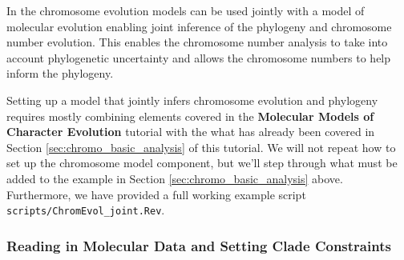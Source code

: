 In \RevBayes the chromosome evolution models can be used jointly with a model of molecular evolution 
enabling joint inference of the phylogeny and chromosome number evolution.
This enables the chromosome number analysis to take into account phylogenetic uncertainty 
and allows the chromosome numbers to help inform the phylogeny. 

Setting up a model that jointly infers chromosome evolution and phylogeny requires mostly combining
elements covered in the \textbf{Molecular Models of Character Evolution} tutorial with the
what has already been covered in Section \ref{sec:chromo_basic_analysis} of this tutorial. We will not repeat how to set up the chromosome model
component, but we'll step through what must be added to the example in Section \ref{sec:chromo_basic_analysis} above.
Furthermore, we have provided a full working example script \texttt{scripts/ChromEvol\_joint.Rev}.

\subsubsection{Reading in Molecular Data and Setting Clade Constraints}

